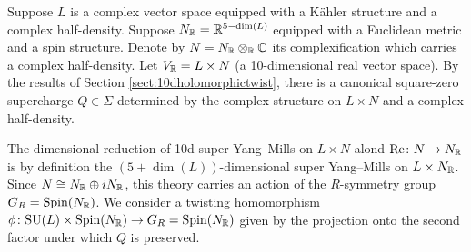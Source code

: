 \documentclass[10pt, oneside]{article}
\renewcommand{\Re}{\mathrm{Re}}
\begin{document}
Suppose $L$ is a complex vector space equipped with a K\"ahler structure and a complex half-density. Suppose $N_\mathbb R=\mathbb R^{5-\dim(L)}$ equipped with a Euclidean metric and a spin structure. Denote by $N=N_\mathbb R\otimes_\mathbb R\mathbb C$ its complexification which carries a complex half-density. Let $V_\mathbb R = L\times N$ (a 10-dimensional real vector space). By the results of Section \ref{sect:10dholomorphictwist}, there is a canonical square-zero supercharge $Q\in\Sigma$ determined by the complex structure on $L\times N$ and a complex half-density.

The dimensional reduction of 10d super Yang--Mills on $L\times N$ alond $\Re\colon N\rightarrow N_\RR$ is by definition the $(5+\dim(L))$-dimensional super Yang--Mills on $L\times N_\mathbb R$. Since $N\cong N_\mathbb R\oplus iN_\mathbb R$, this theory carries an action of the $R$-symmetry group $G_R=\mathrm{Spin}(N_\mathbb R)$. We consider a twisting homomorphism $\phi\colon \mathrm{SU}(L)\times \mathrm{Spin}(N_\mathbb R)\rightarrow G_R=\mathrm{Spin}(N_\mathbb R)$ given by the projection onto the second factor under which $Q$ is preserved.
\end{document}
